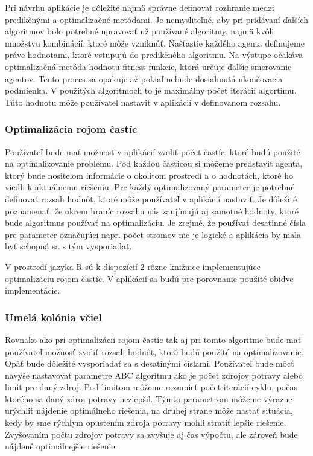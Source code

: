 \documentclass[a4paper,slovak,12pt,appendix]{article}
\begin{document}
Pri návrhu aplikácie je dôležité najmä správne definovať rozhranie medzi
predikčnými a optimalizačné metódami. Je nemysliteľné, aby pri pridávaní
ďalších algoritmov bolo potrebné upravovať už používané algoritmy, najmä kvôli
množstvu kombinácií, ktoré môže vzniknúť. Našťastie každého agenta definujeme
práve hodnotami, ktoré vstupujú do predikčného algoritmu. Na výstupe očakáva
optimalizačná metóda hodnotu fitness funkcie, ktorá určuje ďalšie smerovanie
agentov. Tento proces sa opakuje až pokiaľ nebude dosiahnutá ukončovacia
podmienka. V použitých algoritmoch to je maximálny počet iterácií algortimu.
Túto hodnotu môže používateľ nastaviť v aplikácií v definovanom rozsahu.

\subsubsection{Optimalizácia rojom častíc}
Používateľ bude mať možnosť v aplikácií zvoliť počet častíc, ktoré budú
použité na optimalizovanie problému. Pod každou časticou si môžeme predstaviť
agenta, ktorý bude nositeľom informácie o okolitom prostredí a o hodnotách,
ktoré ho viedli k aktuálnemu riešeniu. Pre každý optimalizovaný parameter je
potrebné definovať rozsah hodnôt, ktoré môže používateľ v aplikácií nastaviť.
Je dôležité poznamenať, že okrem hraníc rozsahu nás zaujímajú aj samotné
hodnoty, ktoré bude algoritmus používať na optimalizáciu. Je zrejmé, že
používať desatinné čísla pre parameter označujúci napr. počet stromov nie je
logické a aplikácia by mala byť schopná sa s tým vysporiadať.

V prostredí jazyka R sú k dispozícií 2 rôzne knižnice implementujúce
optimalizáciu rojom častíc. V aplikácií sa budú pre porovnanie použité obidve
implementácie.

\subsubsection{Umelá kolónia včiel}
Rovnako ako pri optimalizácii rojom častíc tak aj pri tomto algoritme bude mať
používateľ možnosť zvoliť rozsah hodnôt, ktoré budú použité na optimalizovanie.
Opäť bude dôležité vysporiadať sa s desatinými číslami. Používateľ bude môcť
navyše nastavovať parametre ABC algoritmu ako je počet zdrojov potravy alebo
limit pre daný zdroj. Pod limitom môžeme rozumieť počet iterácií cyklu, počas
ktorého sa daný zdroj potravy nezlepšil. Týmto parametrom môžeme výrazne
urýchliť nájdenie optimálneho riešenia, na druhej strane môže nastať situácia,
kedy by sme rýchlym opustením zdroja potravy mohli stratiť lepšie riešenie.
Zvyšovaním počtu zdrojov potravy sa zvyšuje aj čas výpočtu, ale zároveň bude
nájdené optimálnejšie riešenie.
\end{document}
